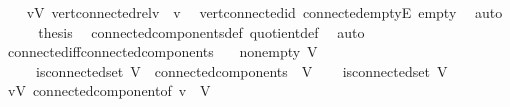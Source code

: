 \begin{isabellebody}
%
\isadelimproof
%
\endisadelimproof
%
\isatagproof
{}\isamarkupfalse%
{\isacharminus}{\kern0pt}\isanewline
\ \ \isamarkupfalse%
\ {\isachardoublequoteopen}{\isasymforall}v{\isasymin}V{\isachardot}{\kern0pt}\ vert{\isacharunderscore}{\kern0pt}connected{\isacharunderscore}{\kern0pt}rel{\isacharbackquote}{\kern0pt}{\isacharbackquote}{\kern0pt}{\isacharbraceleft}{\kern0pt}v{\isacharbraceright}{\kern0pt}\ {\isacharequal}{\kern0pt}\ {\isacharbraceleft}{\kern0pt}v{\isacharbraceright}{\kern0pt}{\isachardoublequoteclose}\ \isamarkupfalse%
\ vert{\isacharunderscore}{\kern0pt}connected{\isacharunderscore}{\kern0pt}id\ connected{\isacharunderscore}{\kern0pt}empty{\isacharunderscore}{\kern0pt}E\ empty\ \isamarkupfalse%
\ auto\isanewline
\ \ \isamarkupfalse%
\ \isamarkupfalse%
\ {\isacharquery}{\kern0pt}thesis\ \isamarkupfalse%
\ connected{\isacharunderscore}{\kern0pt}components{\isacharunderscore}{\kern0pt}def\ quotient{\isacharunderscore}{\kern0pt}def\ \isamarkupfalse%
\ auto\isanewline
{}\isamarkupfalse%
%
\endisatagproof
{\isafoldproof}%
%
\isadelimproof
\isanewline
%
\endisadelimproof
\isanewline
{}\isamarkupfalse%
\ connected{\isacharunderscore}{\kern0pt}iff{\isacharunderscore}{\kern0pt}connected{\isacharunderscore}{\kern0pt}components{\isacharcolon}{\kern0pt}\isanewline
\ \ \ non{\isacharunderscore}{\kern0pt}empty{\isacharcolon}{\kern0pt}\ {\isachardoublequoteopen}V\ {\isasymnoteq}\ {\isacharbraceleft}{\kern0pt}{\isacharbraceright}{\kern0pt}{\isachardoublequoteclose}\isanewline
\ \ \ \ \ {\isachardoublequoteopen}is{\isacharunderscore}{\kern0pt}connected{\isacharunderscore}{\kern0pt}set\ V\ {\isasymlongleftrightarrow}\ connected{\isacharunderscore}{\kern0pt}components\ {\isacharequal}{\kern0pt}\ {\isacharbraceleft}{\kern0pt}V{\isacharbraceright}{\kern0pt}{\isachardoublequoteclose}\isanewline
%
\isadelimproof
%
\endisadelimproof
%
\isatagproof
{}\isamarkupfalse%
\isanewline
\ \ \isamarkupfalse%
\ {\isachardoublequoteopen}is{\isacharunderscore}{\kern0pt}connected{\isacharunderscore}{\kern0pt}set\ V{\isachardoublequoteclose}\isanewline
\ \ \isamarkupfalse%
\ \isamarkupfalse%
\ {\isachardoublequoteopen}{\isasymforall}v{\isasymin}V{\isachardot}{\kern0pt}\ connected{\isacharunderscore}{\kern0pt}component{\isacharunderscore}{\kern0pt}of\ v\ {\isacharequal}{\kern0pt}\ V{\isachardoublequoteclose}\ \isamarkupfalse%

\end{isabellebody}
